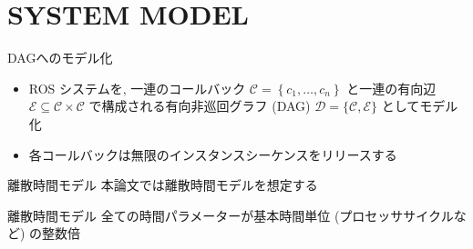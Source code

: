 
\section{SYSTEM MODEL}
\label{sec: system model}



% 

\begin{frame}{DAGへのモデル化}
    \begin{itemize}
        \item ROS システムを, 一連のコールバック $\mathcal{C}=\left\{c_{1}, \ldots, c_{n}\right\}$ と一連の有向辺 $\mathcal{E} \subseteq \mathcal{C} \times \mathcal{C}$ で構成される有向非巡回グラフ (DAG) $\mathcal{D}=\{\mathcal{C}, \mathcal{E}\}$ としてモデル化
        \item 各コールバックは無限のインスタンスシーケンスをリリースする
    \end{itemize}
\end{frame}

\begin{frame}{離散時間モデル}
    本論文では離散時間モデルを想定する
    \begin{block}{離散時間モデル}
        全ての時間パラメーターが基本時間単位 (プロセッササイクルなど) の整数倍
    \end{block}
\end{frame}

